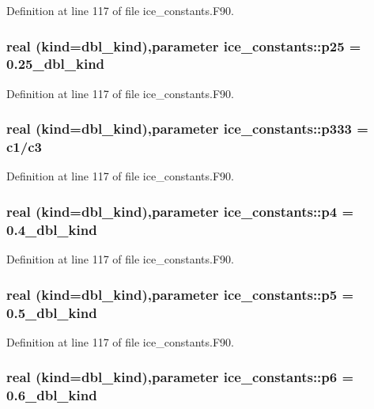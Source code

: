 Definition at line 117 of file ice\_\-constants.F90.\hypertarget{namespaceice__constants_acf8570fae8090e3892e40648fe1a0036}{
\subsubsection[{p25}]{\setlength{\rightskip}{0pt plus 5cm}real (kind=dbl\_\-kind),parameter {\bf ice\_\-constants::p25} = 0.25\_\-dbl\_\-kind}}
\label{namespaceice__constants_acf8570fae8090e3892e40648fe1a0036}


Definition at line 117 of file ice\_\-constants.F90.\hypertarget{namespaceice__constants_a9dfb9e1671683be9cb08717f174638cc}{
\subsubsection[{p333}]{\setlength{\rightskip}{0pt plus 5cm}real (kind=dbl\_\-kind),parameter {\bf ice\_\-constants::p333} = {\bf c1}/{\bf c3}}}
\label{namespaceice__constants_a9dfb9e1671683be9cb08717f174638cc}


Definition at line 117 of file ice\_\-constants.F90.\hypertarget{namespaceice__constants_aa6ad846377c0f3b955303559a2262b78}{
\subsubsection[{p4}]{\setlength{\rightskip}{0pt plus 5cm}real (kind=dbl\_\-kind),parameter {\bf ice\_\-constants::p4} = 0.4\_\-dbl\_\-kind}}
\label{namespaceice__constants_aa6ad846377c0f3b955303559a2262b78}


Definition at line 117 of file ice\_\-constants.F90.\hypertarget{namespaceice__constants_a26872e9df91fb7484a1a2ddefd7b71b0}{
\subsubsection[{p5}]{\setlength{\rightskip}{0pt plus 5cm}real (kind=dbl\_\-kind),parameter {\bf ice\_\-constants::p5} = 0.5\_\-dbl\_\-kind}}
\label{namespaceice__constants_a26872e9df91fb7484a1a2ddefd7b71b0}


Definition at line 117 of file ice\_\-constants.F90.\hypertarget{namespaceice__constants_a86103f3a8306abd46a8a68ede82f2ee4}{
\subsubsection[{p6}]{\setlength{\rightskip}{0pt plus 5cm}real (kind=dbl\_\-kind),parameter {\bf ice\_\-constants::p6} = 0.6\_\-dbl\_\-kind}}
\label{namespaceice__constants_a86103f3a8306abd46a8a68ede82f2ee4}


